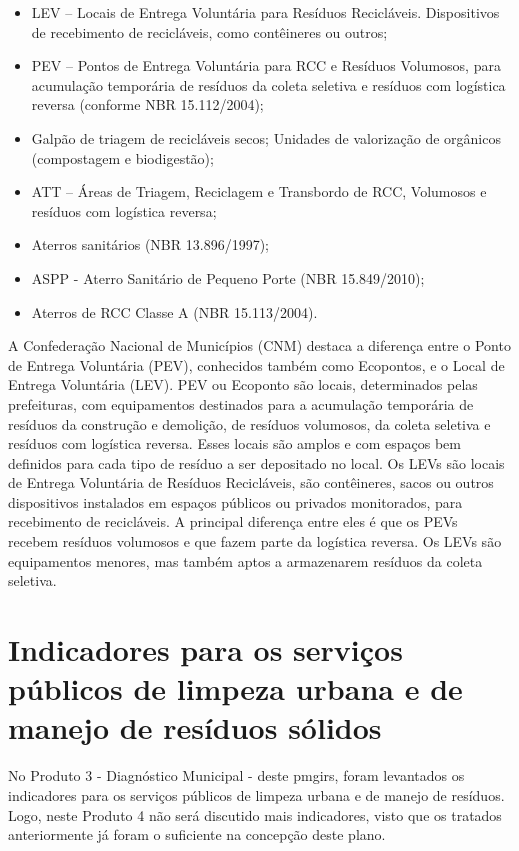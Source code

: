 \begin{itemize}
	\item LEV – Locais de Entrega Voluntária para Resíduos Recicláveis. Dispositivos de recebimento de recicláveis, como contêineres ou outros; 
	\item PEV – Pontos de Entrega Voluntária para RCC e Resíduos Volumosos, para acumulação temporária de resíduos da coleta seletiva e resíduos com logística reversa (conforme NBR 15.112/2004);
	\item Galpão de triagem de recicláveis secos; 
	Unidades de valorização de orgânicos (compostagem e biodigestão);
	\item ATT – Áreas de Triagem, Reciclagem e Transbordo de RCC, Volumosos e resíduos com logística reversa;
	\item Aterros sanitários (NBR 13.896/1997);
	\item ASPP - Aterro Sanitário de Pequeno Porte (NBR 15.849/2010); 
	\item Aterros de RCC Classe A (NBR 15.113/2004).
\end{itemize}

A Confederação Nacional de Municípios (CNM) destaca a diferença entre o Ponto de Entrega Voluntária (PEV), conhecidos também como Ecopontos, e o Local de Entrega Voluntária (LEV). PEV ou Ecoponto são locais, determinados pelas prefeituras, com equipamentos destinados para a acumulação temporária de resíduos da construção e demolição, de resíduos volumosos, da coleta seletiva e resíduos com logística reversa. Esses locais são amplos e com espaços bem definidos para cada tipo de resíduo a ser depositado no local. Os LEVs são locais de Entrega Voluntária de Resíduos Recicláveis, são contêineres, sacos ou outros dispositivos instalados em espaços públicos ou privados monitorados, para recebimento de recicláveis. A principal diferença entre eles é que os PEVs recebem resíduos volumosos e que fazem parte da logística reversa. Os LEVs são equipamentos menores, mas também aptos a armazenarem resíduos da coleta seletiva.

\newpage
\FloatBarrier
\section{Indicadores para os serviços públicos de limpeza urbana e de manejo de resíduos sólidos}
\label{sec:indicadores}

No Produto 3 - Diagnóstico Municipal - deste \gls{pmgirs}, foram levantados os indicadores para os serviços públicos de limpeza urbana e de manejo de resíduos. Logo, neste Produto 4 não será discutido mais indicadores, visto que os tratados anteriormente já foram o suficiente na concepção deste plano.

